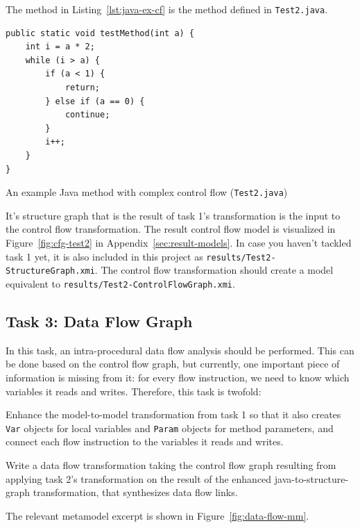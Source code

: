 \documentclass[11pt]{article}
\begin{document}
The method in Listing~\ref{lst:java-ex-cf} is the method defined in
\verb|Test2.java|.

\begin{listing}
  \begin{verbatim}
public static void testMethod(int a) {
    int i = a * 2;
    while (i > a) {
        if (a < 1) {
            return;
        } else if (a == 0) {
            continue;
        }
        i++;
    }
}
  \end{verbatim}
  \caption{An example Java method with complex control flow
    (\texttt{Test2.java})}
  \label{lst:java-ex-cf}
\end{listing}

It's structure graph that is the result of task 1's transformation is the input
to the control flow transformation.  The result control flow model is
visualized in Figure~\ref{fig:cfg-test2} in Appendix~\ref{sec:result-models}.
In case you haven't tackled task 1 yet, it is also included in this project as
\verb|results/Test2-StructureGraph.xmi|.  The control flow transformation
should create a model equivalent to \verb|results/Test2-ControlFlowGraph.xmi|.


\subsection{Task 3: Data Flow Graph}
\label{sec:task3-df-graph}

In this task, an intra-procedural data flow analysis should be performed.  This
can be done based on the control flow graph, but currently, one important piece
of information is missing from it: for every flow instruction, we need to know
which variables it reads and writes.  Therefore, this task is twofold:

\begin{compactenum}
\item Enhance the model-to-model transformation from task 1 so that it also
  creates \verb|Var| objects for local variables and \verb|Param| objects for
  method parameters, and connect each flow instruction to the variables it
  reads and writes.
\item Write a data flow transformation taking the control flow graph resulting
  from applying task 2's transformation on the result of the enhanced
  java-to-structure-graph transformation, that synthesizes data flow links.
\end{compactenum}

The relevant metamodel excerpt is shown in Figure~\ref{fig:data-flow-mm}.
\end{document}
